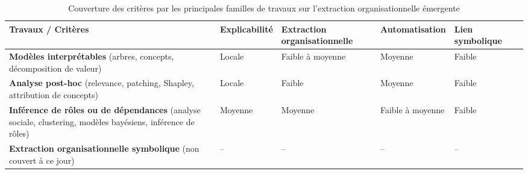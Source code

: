 \begin{table}[h!]
  \centering
  \caption{Couverture des critères par les principales familles de travaux sur l’extraction organisationnelle émergente}
  \label{tab:couverture_criteres_travaux_anl}
  \scriptsize
  \begin{tabular}{|p{4cm}|p{1.7cm}|p{2.3cm}|p{1.7cm}|p{1.7cm}|p{1.7cm}|}
    \hline
    \textbf{Travaux / Critères} & \textbf{Explicabilité} & \textbf{Extraction organisationnelle} & \textbf{Automatisation} & \textbf{Lien symbolique} \\
    \hline
    \textbf{Modèles interprétables} \newline
    (arbres, concepts, décomposition de valeur) \newline
    \cite{zhang2024advancing, milani2022maviper, milani2024interpretable, zabounidis2023concept, liu2025, iturria2024explainable, li2025from}
                                & Locale
                                & Faible à moyenne
                                & Moyenne
                                & Faible                                                                                                              \\
    \hline
    \textbf{Analyse post-hoc} \newline
    (relevance, patching, Shapley, attribution de concepts) \newline
    \cite{grupen2022concept, poupart2025perspectives, li2025from}
                                & Locale
                                & Faible
                                & Moyenne
                                & Faible                                                                                                              \\
    \hline
    \textbf{Inférence de rôles ou de dépendances} \newline
    (analyse sociale, clustering, modèles bayésiens, inférence de rôles) \newline
    \cite{berenji2000learning, yusuf2020inferential, serrino2019finding, Wang2020, subramanian2024neurosymbolic}
                                & Moyenne
                                & Moyenne
                                & Faible à moyenne
                                & Faible                                                                                                              \\
    \hline
    \textbf{Extraction organisationnelle symbolique} \newline
    (non couvert à ce jour)
                                & --
                                & --
                                & --
                                & --                                                                                                                  \\
    \hline
  \end{tabular}
\end{table}

